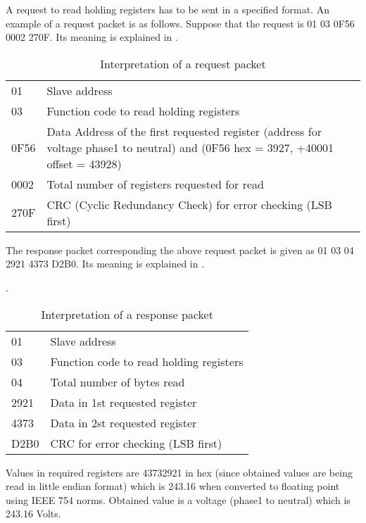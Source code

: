 A request to read holding registers has to be sent in a specified
format. An example of a request packet is as follows.  Suppose that
the request is 01 03 0F56 0002 270F.  Its meaning is explained in
.
\begin{table}
\centering
\caption{Interpretation of a request packet}
\label{tab:request-packet}
\begin{tabular}{lp{10cm}}
01 &  Slave address \\
03 & Function code to read holding registers \\
0F56 & Data Address of the first requested register (address for
voltage phase1 to neutral) and 
(0F56 hex = 3927, +40001 offset = 43928) \\
0002 & Total number of registers requested for read \\
270F & CRC (Cyclic Redundancy Check) for error checking (LSB first) \\
\end{tabular}
\end{table}
The response packet corresponding the above request packet
is given as 01 03 04 2921 4373 D2B0.  Its meaning is explained in
.
\begin{table}
\centering
\caption{Interpretation of a response packet}
\label{tab:response-packet}.
\begin{tabular}{ll}
01 & Slave address \\
03 & Function code to read holding registers \\
04 & Total number of bytes read   \\
2921 & Data in 1st requested register \\
4373 & Data in 2st requested register \\
D2B0 & CRC for error checking (LSB first)
\end{tabular}
\end{table}

Values in required registers are 43732921 in hex (since obtained
values are being read in little endian format) which is 243.16 when
converted to floating point using IEEE 754 norms. Obtained value is a
voltage (phase1 to neutral) which is 243.16 Volts.  

